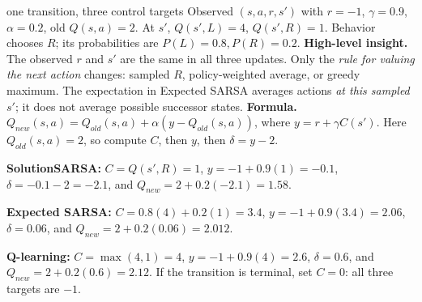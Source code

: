 \documentclass[10pt,a4paper]{article}
\newcommand{\ans}{\par\smallskip\textbf{\color{good}Solution\quad}}
\begin{document}
\begin{question}{one transition, three control targets}
Observed $(s,a,r,s')$ with $r=-1$, $\gamma=0.9$, $\alpha=0.2$, old $Q(s,a)=2$. At $s'$, $Q(s',L)=4$, $Q(s',R)=1$. Behavior chooses $R$; its probabilities are $P(L)=0.8,P(R)=0.2$.
\textbf{High-level insight.} The observed $r$ and $s'$ are the same in all three updates. Only the \emph{rule for valuing the next action} changes: sampled $R$, policy-weighted average, or greedy maximum. The expectation in Expected SARSA averages actions \emph{at this sampled $s'$}; it does not average possible successor states.
\textbf{Formula.} $Q_{new}(s,a)=Q_{old}(s,a)+\alpha(y-Q_{old}(s,a))$, where $y=r+\gamma C(s')$. Here $Q_{old}(s,a)=2$, so compute $C$, then $y$, then $\delta=y-2$.
\ans \textbf{SARSA:} $C=Q(s',R)=1$, $y=-1+0.9(1)=-0.1$, $\delta=-0.1-2=-2.1$, and $Q_{new}=2+0.2(-2.1)=\boxed{1.58}$.

\textbf{Expected SARSA:} $C=0.8(4)+0.2(1)=3.4$, $y=-1+0.9(3.4)=2.06$, $\delta=0.06$, and $Q_{new}=2+0.2(0.06)=\boxed{2.012}$.

\textbf{Q-learning:} $C=\max(4,1)=4$, $y=-1+0.9(4)=2.6$, $\delta=0.6$, and $Q_{new}=2+0.2(0.6)=\boxed{2.12}$. If the transition is terminal, set $C=0$: all three targets are $-1$.
\end{question}
\end{document}
